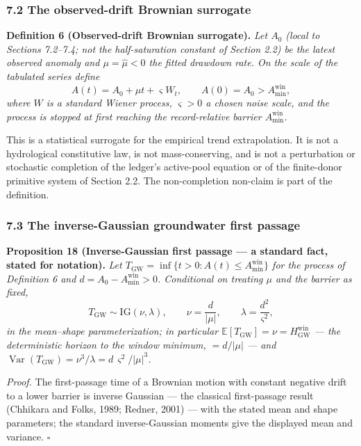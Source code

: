 \documentclass[11pt]{article}
\begin{document}
\subsubsection{7.2 The observed-drift Brownian
surrogate}\label{the-observed-drift-brownian-surrogate}

\textbf{Definition 6 (Observed-drift Brownian surrogate).} \emph{Let
\(A_0\) (local to Sections 7.2--7.4; not the half-saturation constant of
Section 2.2) be the latest observed anomaly and
\(\mu = \widehat\mu < 0\) the fitted drawdown rate. On the scale of the
tabulated series define}
\[A(t) = A_0 + \mu t + \varsigma W_t, \qquad A(0) = A_0 > A_{\min}^{\mathrm{win}},\]
\emph{where \(W\) is a standard Wiener process, \(\varsigma > 0\) a
chosen noise scale, and the process is stopped at first reaching the
record-relative barrier \(A_{\min}^{\mathrm{win}}\).}

This is a statistical surrogate for the empirical trend extrapolation.
It is not a hydrological constitutive law, is not mass-conserving, and
is not a perturbation or stochastic completion of the ledger's
active-pool equation or of the finite-donor primitive system of Section
2.2. The non-completion non-claim is part of the definition.

\subsubsection{7.3 The inverse-Gaussian groundwater first
passage}\label{the-inverse-gaussian-groundwater-first-passage}

\textbf{Proposition 18 (Inverse-Gaussian first passage --- a standard
fact, stated for notation).} \emph{Let
\(T_{\mathrm{GW}} = \inf\{ t > 0 : A(t) \le A_{\min}^{\mathrm{win}} \}\)
for the process of Definition 6 and
\(d = A_0 - A_{\min}^{\mathrm{win}} > 0\). Conditional on treating
\(\mu\) and the barrier as fixed,}
\[T_{\mathrm{GW}} \sim \mathrm{IG}(\nu, \lambda), \qquad \nu = \frac{d}{|\mu|}, \qquad \lambda = \frac{d^2}{\varsigma^2},\]
\emph{in the mean--shape parameterization; in particular
\(\mathbb{E}[T_{\mathrm{GW}}] = \nu = H^{\mathrm{win}}_{\mathrm{GW}}\)
--- the deterministic horizon to the window minimum, \(= d/|\mu|\) ---
and
\(\operatorname{Var}(T_{\mathrm{GW}}) = \nu^3/\lambda = d\,\varsigma^2/|\mu|^3\).}

\emph{Proof.} The first-passage time of a Brownian motion with constant
negative drift to a lower barrier is inverse Gaussian --- the classical
first-passage result (Chhikara and Folks, 1989; Redner, 2001) --- with
the stated mean and shape parameters; the standard inverse-Gaussian
moments give the displayed mean and variance. \ensuremath{\square}
\end{document}

